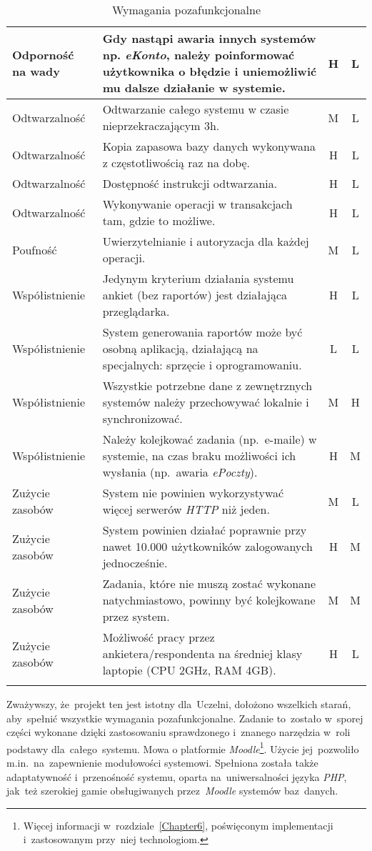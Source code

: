\begin{center}
\begin{longtable}{ | p{4cm} | p{9cm} | c | c | }
%
Odporność na wady & Gdy nastąpi awaria innych systemów np. \textit{eKonto}, należy poinformować użytkownika o błędzie i uniemożliwić mu dalsze działanie w systemie. & H & L \\ \hline
%
Odtwarzalność & Odtwarzanie całego systemu w czasie nieprzekraczającym 3h. & M & L \\ \hline
Odtwarzalność & Kopia zapasowa bazy danych wykonywana z częstotliwością raz na dobę. & H & L \\ \hline
Odtwarzalność & Dostępność instrukcji odtwarzania. & H & L \\ \hline
Odtwarzalność & Wykonywanie operacji w transakcjach tam, gdzie to możliwe. & H & L \\ \hline
%
Poufność & Uwierzytelnianie i autoryzacja dla każdej operacji. & M & L \\ \hline
%
Współistnienie & Jedynym kryterium działania systemu ankiet (bez raportów) jest działająca przeglądarka. & H & L \\ \hline
Współistnienie & System generowania raportów może być osobną aplikacją, działającą na specjalnych: sprzęcie i oprogramowaniu. & L & L \\ \hline
Współistnienie & Wszystkie potrzebne dane z zewnętrznych systemów należy przechowywać lokalnie i synchronizować. & M & H \\ \hline
Współistnienie & Należy kolejkować zadania (np.~e-maile) w systemie, na czas braku możliwości ich wysłania (np.~awaria \textit{ePoczty}). & H & M \\ \hline
%
Zużycie zasobów & System nie powinien wykorzystywać więcej serwerów \textit{HTTP} niż jeden. & M & L \\ \hline
Zużycie zasobów & System powinien działać poprawnie przy nawet 10.000 użytkowników zalogowanych jednocześnie. & H & M \\ \hline
Zużycie zasobów & Zadania, które nie muszą zostać wykonane natychmiastowo, powinny być kolejkowane przez system. & M & M \\ \hline
Zużycie zasobów & Możliwość pracy przez ankietera\slash respondenta na średniej klasy laptopie (CPU 2GHz, RAM 4GB). & H & L \\ \hline
%
\caption{Wymagania pozafunkcjonalne}\label{tab:reqs}
\end{longtable}
\end{center}

Zważywszy, że~projekt ten jest istotny dla~Uczelni, dołożono wszelkich starań, aby~spełnić wszystkie wymagania pozafunkcjonalne. Zadanie to~zostało w~sporej części wykonane dzięki zastosowaniu sprawdzonego i~znanego narzędzia w~roli podstawy dla~całego~systemu. Mowa o platformie \textit{Moodle}\footnote{Więcej informacji w~rozdziale~\ref{Chapter6}, poświęconym implementacji i~zastosowanym przy~niej technologiom.}. Użycie jej~pozwoliło m.in.~na~zapewnienie modułowości systemowi. Spełniona została także adaptatywność i~przenośność systemu, oparta na~uniwersalności języka \textit{PHP}, jak~też szerokiej gamie obsługiwanych przez~\textit{Moodle} systemów baz~danych. \\

